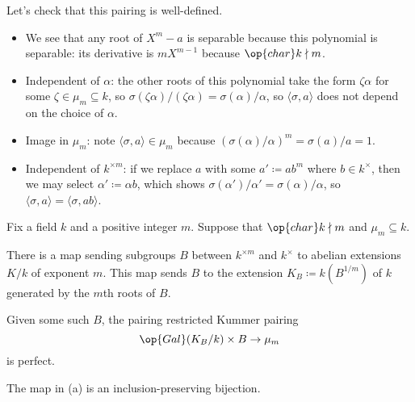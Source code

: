 \documentclass[notes.tex]{subfiles}
\begin{document}
\begin{remark}
	Let's check that this pairing is well-defined.
	\begin{itemize}
		\item We see that any root of $X^m-a$ is separable because this polynomial is separable: its derivative is $mX^{m-1}$ because $\op{char}k\nmid m$.
		\item Independent of $\alpha$: the other roots of this polynomial take the form $\zeta\alpha$ for some $\zeta\in\mu_m\subseteq k$, so $\sigma(\zeta\alpha)/(\zeta\alpha)=\sigma(\alpha)/\alpha$, so $\langle\sigma,a\rangle$ does not depend on the choice of $\alpha$.
		\item Image in $\mu_m$: note $\langle\sigma,a\rangle\in\mu_m$ because $(\sigma(\alpha)/\alpha)^m=\sigma(a)/a=1$.
		\item Independent of $k^{\times m}$: if we replace $a$ with some $a'\coloneqq ab^m$ where $b\in k^\times$, then we may select $\alpha'\coloneqq\alpha b$, which shows $\sigma(\alpha')/\alpha'=\sigma(\alpha)/\alpha$, so $\langle\sigma,a\rangle=\langle\sigma,ab\rangle$.
	\end{itemize}
\end{remark}
\begin{theorem}[Kummer] \label{thm:kummer}
	Fix a field $k$ and a positive integer $m$. Suppose that $\op{char}k\nmid m$ and $\mu_m\subseteq k$.
	\begin{listalph}
		\item There is a map sending subgroups $B$ between $k^{\times m}$ and $k^\times$ to abelian extensions $K/k$ of exponent $m$. This map sends $B$ to the extension $K_B\coloneqq k(B^{1/m})$ of $k$ generated by the $m$th roots of $B$.
		\item Given some such $B$, the pairing restricted Kummer pairing
		\[\op{Gal}(K_B/k)\times B\to\mu_m\]
		is perfect.
		\item The map in (a) is an inclusion-preserving bijection.
	\end{listalph}
\end{theorem}
\end{document}
